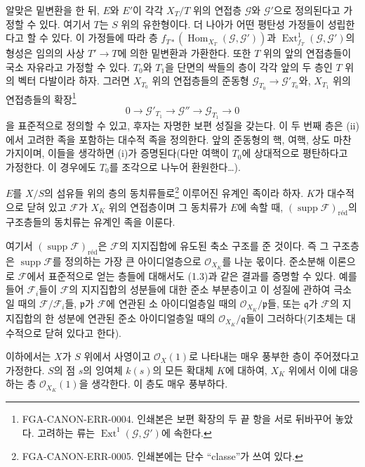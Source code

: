 알맞은 밑변환을 한 뒤, $E$와 $E'$이 각각 $X_T/T$ 위의 연접층
$\mathcal G$와 $\mathcal G'$으로 정의된다고 가정할 수 있다. 여기서
$T$는 $S$ 위의 유한형이다. 더 나아가 어떤 평탄성 가정들이 성립한다고
할 수 있다. 이 가정들에 따라 층
$f_{T*}(\operatorname{Hom}_{X_T}(\mathcal G,\mathcal G'))$과
$\operatorname{Ext}^{1}_{f_T}(\mathcal G,\mathcal G')$의 형성은
임의의 사상 $T'\longrightarrow T$에 의한 밑변환과 가환한다. 또한 $T$
위의 앞의 연접층들이 국소 자유라고 가정할 수 있다. $T_0$와 $T_1$을
단면의 싹들의 층이 각각 앞의 두 층인 $T$ 위의 벡터 다발이라 하자. 그러면
$X_{T_0}$ 위의 연접층들의 준동형
$\mathcal G_{T_0}\longrightarrow\mathcal G'_{T_0}$와, $X_{T_1}$ 위의
연접층들의 확장\footnote{FGA-CANON-ERR-0004. 인쇄본은 보편 확장의 두
끝 항을 서로 뒤바꾸어 놓았다. 고려하는 류는
$\operatorname{Ext}^1(\mathcal G,\mathcal G')$에 속한다.}
\[
0\longrightarrow\mathcal G'_{T_1}\longrightarrow\mathcal G''
\longrightarrow\mathcal G_{T_1}\longrightarrow0
\]
을 표준적으로 정의할 수 있고, 후자는 자명한 보편 성질을 갖는다. 이 두 번째
층은 (ii)에서 고려한 족을 포함하는 대수적 족을 정의한다. 앞의 준동형의
핵, 여핵, 상도 마찬가지이며, 이들을 생각하면 (i)가 증명된다(다만 여핵이
$T_0$에 상대적으로 평탄하다고 가정한다. 이 경우에도 $T_0$를 조각으로
나누어 환원한다\ldots).

 $E$를 $X/S$의 섬유들 위의 층의
동치류들로\footnote{FGA-CANON-ERR-0005. 인쇄본에는 단수 ``classe''가
쓰여 있다.} 이루어진 유계인 족이라 하자. $K$가 대수적으로 닫혀 있고
$\mathcal F$가 $X_K$ 위의 연접층이며 그 동치류가 $E$에 속할 때,
$(\operatorname{supp}\mathcal F)_{\mathrm{réd}}$의 구조층들의 동치류는
유계인 족을 이룬다.

여기서 $(\operatorname{supp}\mathcal F)_{\mathrm{réd}}$은
$\mathcal F$의 지지집합에 유도된 축소 구조를 준 것이다. 즉 그 구조층은
$\operatorname{supp}\mathcal F$를 정의하는 가장 큰 아이디얼층으로
$\mathcal O_{X_K}$를 나눈 몫이다. 준소분해 이론으로 $\mathcal F$에서
표준적으로 얻는 층들에 대해서도 (1.3)과 같은 결과를 증명할 수 있다. 예를
들어 $\mathcal F_i$들이 $\mathcal F$의 지지집합의 성분들에 대한 준소
부분층이고 이 성질에 관하여 극소일 때의 $\mathcal F/\mathcal F_i$들,
$\mathfrak p$가 $\mathcal F$에 연관된 소 아이디얼층일 때의
$\mathcal O_{X_K}/\mathfrak p$들, 또는 $\mathfrak q$가 $\mathcal F$의
지지집합의 한 성분에 연관된 준소 아이디얼층일 때의
$\mathcal O_{X_K}/\mathfrak q$들이 그러하다(기초체는 대수적으로 닫혀 있다고
한다).


이하에서는 $X$가 $S$ 위에서 사영이고 $\mathcal O_X(1)$로 나타내는 매우
풍부한 층이 주어졌다고 가정한다. $S$의 점 $s$의 잉여체 $k(s)$의 모든
확대체 $K$에 대하여, $X_K$ 위에서 이에 대응하는 층
$\mathcal O_{X_K}(1)$을 생각한다. 이 층도 매우 풍부하다.

